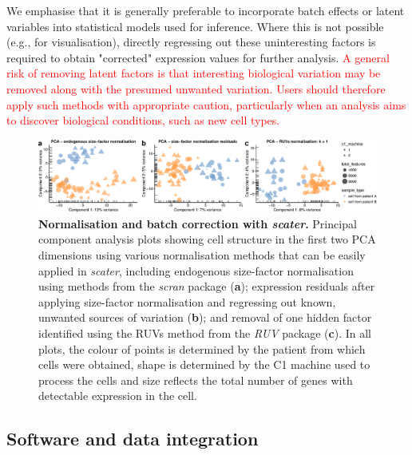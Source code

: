 \documentclass{bioinfo}
\newcommand{\revised}[1]{\textcolor{red}{#1}}
\begin{document}
We emphasise that it is generally preferable to incorporate batch effects or latent variables into statistical models used for inference. Where this is not possible (e.g., for visualisation), directly regressing out these uninteresting factors is required to obtain "corrected" expression values for further analysis. \revised{A general risk of removing latent factors is that interesting biological variation may be removed along with the presumed unwanted variation. Users should therefore apply such methods with appropriate caution, particularly when an analysis aims to discover biological conditions, such as new cell types.}

\begin{figure}[!tpb]%
\centerline{\includegraphics[width=\textwidth]{figure5.eps}}
\caption{\textbf{Normalisation and batch correction with
\emph{scater}.} Principal component analysis plots showing cell
structure in the first two PCA dimensions using various normalisation
methods that can be easily applied in \emph{scater}, including
endogenous size-factor normalisation using methods from the \emph{scran}
package (\textbf{a}); expression residuals after applying size-factor
normalisation and regressing out known, unwanted sources of variation
(\textbf{b}); and removal of one hidden factor identified using
the RUVs method from the \emph{RUV} package (\textbf{c}). In all plots,
the colour of points is determined by the patient from which cells were
obtained, shape is determined by the C1 machine used to process the
cells and size reflects the total number of genes with detectable
expression in the cell.}\label{fig:05}
\end{figure}


\subsection{Software and data integration}\label{software-and-data-integration}
\end{document}

